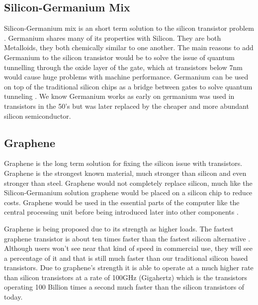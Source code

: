\documentclass[journal]{IEEEtran}
\begin{document}
\subsection{Silicon-Germanium Mix}
Silicon-Germanium mix is an short term solution to the silicon transistor problem \cite{8947469320180101}. Germanium shares many of its properties with Silicon. They are both Metalloids, they both chemically similar to one another. The main reasons to add Germanium to the silicon transistor would be to solve the issue of quantum tunnelling through the oxide layer of the gate, which at transistors below 7nm would cause huge problems with machine performance. Germanium can be used on top of the traditional silicon chips as a bridge between gates to solve quantum tunneling \cite{ye_2016}. We know Germanium works as early on germanium was used in transistors in the 50's but was later replaced by the cheaper and more abundant silicon semiconductor. 

\subsection{Graphene}
Graphene is the long term solution for fixing the silicon issue with transistors. Graphene is the strongest known material, much stronger than silicon and even stronger than steel. Graphene would not completely replace silicon, much like the Silicon-Germanium solution graphene would be placed on a silicon chip to reduce costs. Graphene would be used in the essential parts of the computer like the central processing unit before being introduced later into other components \cite{48600520130101}.

Graphene is being proposed due to its strength as higher loads. The fastest graphene transistor is about ten times faster than the fastest silicon alternative \cite{bourzac_2010}. Although users won't see near that kind of speed in commercial use, they will see a percentage of it and that is still much faster than our traditional silicon based transistors. Due to graphene's strength it is able to operate at a much higher rate than silicon transistors at a rate of 100GHz (Gigahertz) which is the transistors operating 100 Billion times a second much faster than the silicon transistors of today. 



\printbibliography
\end{document}

